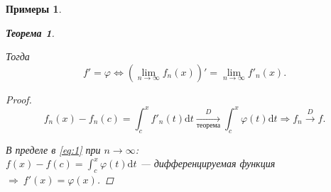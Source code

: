 \documentclass[a4paper, 12pt]{article}
\newtheorem{Examples}{Примеры}
\newtheorem{Thm}{Теорема}
\begin{document}
\begin{Examples}
\begin{enumerate}
\begin{Thm}
\begin{enumerate}
                    \end{enumerate}
                    Тогда
                    \[f' = \varphi
                    \Leftrightarrow (\lim_{n \rightarrow \infty} f_n(x))' =
                    \lim_{n \rightarrow \infty} f'_n(x).\]

                    \begin{proof}
                        \begin{equation} \label{eq:1}
                            f_n(x) - f_n(c) = \int^{x}_{c} f'_n(t)\mathrm{d}t
                            \underset{\text{теорема}}{\xrightarrow{D}}
                            \int^{x}_{c} \varphi(t)\mathrm{d}t \Rightarrow f_n
                            \xrightarrow{D} f.
                        \end{equation}

                        В пределе в \eqref{eq:1} при \(n \rightarrow \infty\):\\
                        \(f(x) - f(c) = \int^{x}_{c} \varphi(t)\mathrm{d}t\) --- дифференцируемая функция
                        \( \Rightarrow\ f'(x) = \varphi(x)\).
                    \end{proof}
                \end{Thm}
         \end{enumerate}
    \end{Examples}
\end{document}
